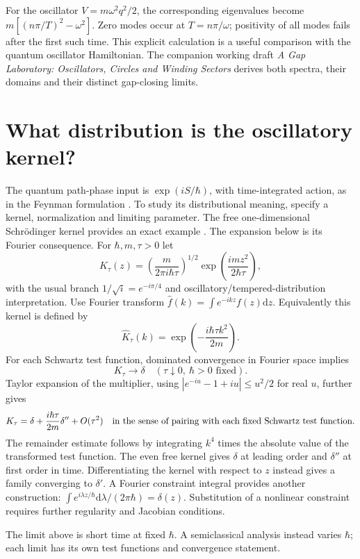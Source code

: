 \documentclass[11pt,a4paper]{article}
\newcommand{\dd}{\mathrm{d}}
\begin{document}
For the oscillator $V=m\omega^2q^2/2$, the corresponding eigenvalues become
$m[(n\pi/T)^2-\omega^2]$. Zero modes occur at $T=n\pi/\omega$; positivity of
all modes fails after the first such time. This explicit calculation is a useful
comparison with the quantum oscillator Hamiltonian. The companion working draft
\emph{A Gap Laboratory: Oscillators, Circles and Winding Sectors} derives both
spectra, their domains and their distinct gap-closing limits.

\section{What distribution is the oscillatory kernel?}
The quantum path-phase input is $\exp(iS/\hbar)$, with time-integrated action,
as in the Feynman formulation \cite{Feynman1948,FeynmanLectures}. To study its
distributional meaning, specify a kernel, normalization and limiting parameter.
The free one-dimensional Schr\"odinger kernel provides an exact example
\cite[\S7.3, (7.30)]{Teschl2009}. The expansion below is its Fourier consequence.
For $\hbar,m,\tau>0$ let
\[
 K_\tau(z)=\left(\frac{m}{2\pi i\hbar\tau}\right)^{1/2}
 \exp\left(\frac{imz^2}{2\hbar\tau}\right),
\]
with the usual branch $1/\sqrt{i}=e^{-i\pi/4}$ and oscillatory/tempered-distribution
interpretation. Use Fourier transform
$\widehat f(k)=\int e^{-ikz}f(z)\dd z$. Equivalently this kernel is defined by
\[
 \widehat K_\tau(k)=\exp\left(-\frac{i\hbar\tau k^2}{2m}\right).
\]
For each Schwartz test function, dominated convergence in Fourier space implies
\begin{equation}\label{eq:kernel}
 K_\tau\longrightarrow\delta\quad(\tau\downarrow0,\ \hbar>0\text{ fixed}).
\end{equation}
Taylor expansion of the multiplier, using
$|e^{-iu}-1+iu|\le u^2/2$ for real $u$, further gives
\[
 K_\tau=\delta+\frac{i\hbar\tau}{2m}\delta''+O(\tau^2)
 \quad\hbox{in the sense of pairing with each fixed Schwartz test function.}
\]
The remainder estimate follows by integrating $k^4$ times the absolute value of
the transformed test function. The even free kernel gives $\delta$ at leading
order and $\delta''$ at first order in time. Differentiating the kernel with
respect to $z$ instead gives a family converging to $\delta'$.
A Fourier constraint integral provides another construction:
$\int e^{i\lambda z/\hbar}\dd\lambda/(2\pi\hbar)=\delta(z)$.
Substitution of a nonlinear constraint
requires further regularity and Jacobian conditions.

The limit above is short time at fixed $\hbar$. A semiclassical analysis instead
varies $\hbar$; each limit has its own test functions and convergence statement.
\end{document}
